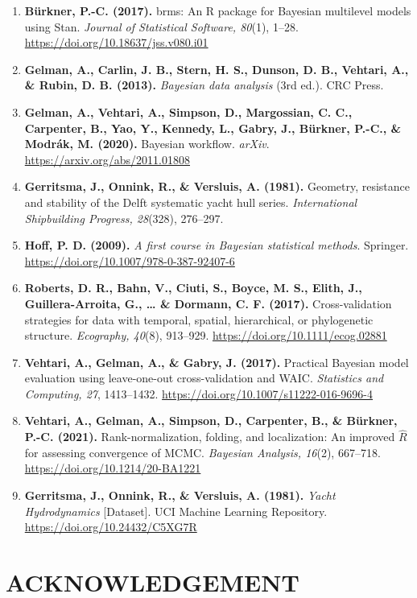 \documentclass[
]{article}
\providecommand{\tightlist}{%
  \setlength{\itemsep}{0pt}\setlength{\parskip}{0pt}}
\begin{document}
\begin{enumerate}
\def\labelenumi{\arabic{enumi}.}
\tightlist
\item
  \textbf{Bürkner, P.-C. (2017).} brms: An R package for Bayesian
  multilevel models using Stan. \emph{Journal of Statistical Software,
  80}(1), 1--28. \url{https://doi.org/10.18637/jss.v080.i01}
\item
  \textbf{Gelman, A., Carlin, J. B., Stern, H. S., Dunson, D. B.,
  Vehtari, A., \& Rubin, D. B. (2013).} \emph{Bayesian data analysis}
  (3rd ed.). CRC Press.
\item
  \textbf{Gelman, A., Vehtari, A., Simpson, D., Margossian, C. C.,
  Carpenter, B., Yao, Y., Kennedy, L., Gabry, J., Bürkner, P.-C., \&
  Modrák, M. (2020).} Bayesian workflow. \emph{arXiv}.
  \url{https://arxiv.org/abs/2011.01808}
\item
  \textbf{Gerritsma, J., Onnink, R., \& Versluis, A. (1981).} Geometry,
  resistance and stability of the Delft systematic yacht hull series.
  \emph{International Shipbuilding Progress, 28}(328), 276--297.
\item
  \textbf{Hoff, P. D. (2009).} \emph{A first course in Bayesian
  statistical methods}. Springer.
  \url{https://doi.org/10.1007/978-0-387-92407-6}
\item
  \textbf{Roberts, D. R., Bahn, V., Ciuti, S., Boyce, M. S., Elith, J.,
  Guillera-Arroita, G., \ldots{} \& Dormann, C. F. (2017).}
  Cross-validation strategies for data with temporal, spatial,
  hierarchical, or phylogenetic structure. \emph{Ecography, 40}(8),
  913--929. \url{https://doi.org/10.1111/ecog.02881}
\item
  \textbf{Vehtari, A., Gelman, A., \& Gabry, J. (2017).} Practical
  Bayesian model evaluation using leave-one-out cross-validation and
  WAIC. \emph{Statistics and Computing, 27}, 1413--1432.
  \url{https://doi.org/10.1007/s11222-016-9696-4}
\item
  \textbf{Vehtari, A., Gelman, A., Simpson, D., Carpenter, B., \&
  Bürkner, P.-C. (2021).} Rank-normalization, folding, and localization:
  An improved \(\hat R\) for assessing convergence of MCMC.
  \emph{Bayesian Analysis, 16}(2), 667--718.
  \url{https://doi.org/10.1214/20-BA1221}
\item
  \textbf{Gerritsma, J., Onnink, R., \& Versluis, A. (1981).}
  \emph{Yacht Hydrodynamics} {[}Dataset{]}. UCI Machine Learning
  Repository. \url{https://doi.org/10.24432/C5XG7R}
\end{enumerate}

\section{ACKNOWLEDGEMENT}\label{acknowledgement}
\end{document}
